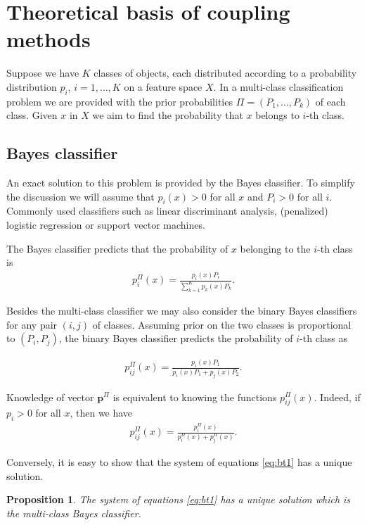 \documentclass[twoside,11pt]{article}
\newtheorem{prop}{Proposition}
\begin{document}
\section{Theoretical basis of coupling methods}

Suppose we have $K$ classes of objects, each distributed according to a probability distribution $p_i$, $i=1,\ldots, K$ on a feature space $X$. In a multi-class classification problem we are provided with the prior probabilities $\Pi = (P_1, \ldots, P_k)$ of each class. Given $x$ in $X$ we aim to find the probability that $x$ belongs to $i$-th class. 


\subsection{Bayes classifier}

An exact solution to this problem is provided by the Bayes classifier. To simplify the discussion we will assume that $p_i(x) > 0$ for all $x$ and $P_i > 0$ for all $i$. Commonly used classifiers such as linear discriminant analysis, (penalized) logistic regression or support vector machines.

 The Bayes classifier predicts that the probability of $x$ belonging to the $i$-th class is
\begin{align}
 p^\Pi_i(x) = \frac{p_i(x) P_i}{\sum_{k=1}^K p_k(x)P_k}.
\end{align}

Besides the multi-class classifier we may also consider the binary Bayes classifiers for any pair $(i,j)$ of classes. Assuming prior on the two classes is proportional to $(P_i, P_j)$, the binary Bayes classifier predicts the probability of $i$-th class as 

\begin{align}
	p_{ij}^\Pi(x) = \frac{p_i(x) P_1}{p_i(x)P_1 + p_j(x)P_2}.
\end{align}

Knowledge of vector $\boldsymbol{p}^\Pi$ is  equivalent to knowing the functions $p^\Pi_{ij}(x)$. Indeed, if $p_{i}> 0$ for all $x$, then we have
\begin{align}
p_{ij}^\Pi(x) = \frac{p_i^\Pi(x)}{p_i^\Pi(x) + p_j^\Pi(x)}. \label{eq:bt1}
\end{align}

Conversely, it is easy to show that  the system of equations \eqref{eq:bt1} has a unique solution.

\begin{prop} \label{prop:binary2multi}
The system of  equations \eqref{eq:bt1}  has a unique solution which is the multi-class Bayes classifier.
\end{prop}
\end{document}
